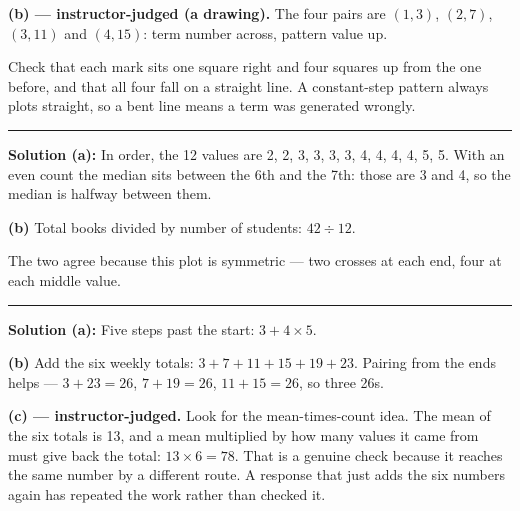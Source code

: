 \documentclass[12pt]{article}
\begin{document}
\textbf{(b) --- instructor-judged (a drawing).} The four pairs are $(1, 3)$, $(2, 7)$, $(3, 11)$ and $(4, 15)$: term number across, pattern value up.

Check that each mark sits one square right and four squares up from the one before, and that all four fall on a straight line. A constant-step pattern always plots straight, so a bent line means a term was generated wrongly.

\vspace{0.15cm}\noindent\rule{\linewidth}{0.2pt}\vspace{0.15cm}


\textbf{Solution (a):} In order, the 12 values are 2, 2, 3, 3, 3, 3, 4, 4, 4, 4, 5, 5. With an even count the median sits between the 6th and the 7th: those are 3 and 4, so the median is halfway between them. 

\textbf{(b)} Total books divided by number of students: $42 \div 12$. 

The two agree because this plot is symmetric --- two crosses at each end, four at each middle value.

\vspace{0.15cm}\noindent\rule{\linewidth}{0.2pt}\vspace{0.15cm}


\textbf{Solution (a):} Five steps past the start: $3 + 4 \times 5$. 

\textbf{(b)} Add the six weekly totals: $3 + 7 + 11 + 15 + 19 + 23$. Pairing from the ends helps --- $3 + 23 = 26$, $7 + 19 = 26$, $11 + 15 = 26$, so three 26s. 

\textbf{(c) --- instructor-judged.} Look for the mean-times-count idea. The mean of the six totals is 13, and a mean multiplied by how many values it came from must give back the total: $13 \times 6 = 78$. That is a genuine check because it reaches the same number by a different route. A response that just adds the six numbers again has repeated the work rather than checked it.
\end{document}
